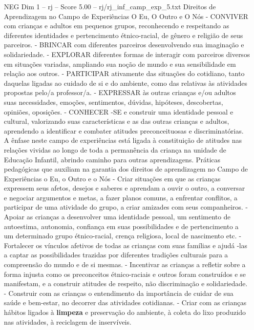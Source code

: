 \begin{textsample}{NEG Dim 1 – rj – Score 5.00 – rj/rj\_inf\_camp\_exp\_5.txt}  \label{ex:f1_neg_013}
Direitos de Aprendizagem no Campo de Experiências O Eu, O Outro e O Nós - CONVIVER com crianças e adultos em pequenos grupos, reconhecendo e respeitando as diferentes identidades e pertencimento étnico-racial, de gênero e religião de seus parceiros. - BRINCAR com diferentes parceiros desenvolvendo sua imaginação e solidariedade. - EXPLORAR diferentes formas de interagir com parceiros diversos em situações variadas, ampliando sua noção de mundo e sua sensibilidade em relação aos outros. - PARTICIPAR ativamente das situações do cotidiano, tanto daquelas ligadas ao cuidado de si e do ambiente, como das relativas às atividades propostas pelo/a professor/a. - EXPRESSAR às outras crianças e/ou adultos suas necessidades, emoções, sentimentos, dúvidas, hipóteses, descobertas, opiniões, oposições. - CONHECER -SE e construir uma identidade pessoal e cultural, valorizando suas características e as das outras crianças e adultos, aprendendo a identificar e combater atitudes preconceituosas e discriminatórias.
A ênfase neste campo de experiências está ligada à constituição de atitudes nas relações vividas ao longo de toda a permanência da criança na unidade de Educação Infantil, abrindo caminho para outras aprendizagens.
Práticas pedagógicas que auxiliam na garantia dos direitos de aprendizagem no Campo de Experiências o Eu, o Outro e o Nós - Criar situações em que as crianças expressem seus afetos, desejos e saberes e aprendam a ouvir o outro, a conversar e negociar argumentos e metas, a fazer planos comuns, a enfrentar conflitos, a participar de uma atividade do grupo, a criar amizades com seus companheiros. - Apoiar as crianças a desenvolver uma identidade pessoal, um sentimento de autoestima, autonomia, confiança em suas possibilidades e de pertencimento a um determinado grupo étnico-racial, crença religiosa, local de nascimento etc. - Fortalecer os vínculos afetivos de todas as crianças com suas famílias e ajudá -las a captar as possibilidades trazidas por diferentes tradições culturais para a compreensão do mundo e de si mesmas. - Incentivar as crianças a refletir sobre a forma injusta como os preconceitos étnico-raciais e outros foram construídos e se manifestam, e a construir atitudes de respeito, não discriminação e solidariedade. - Construir com as crianças o entendimento da importância de cuidar de sua saúde e bem-estar, no decorrer das atividades cotidianas. - Criar com as crianças hábitos ligados à \textbf{limpeza} e preservação do ambiente, à coleta do lixo produzido nas atividades, à reciclagem de inservíveis.

\end{textsample}
